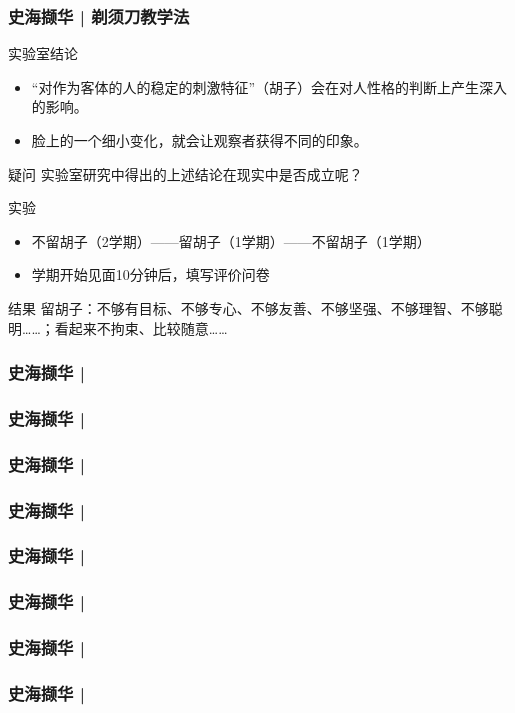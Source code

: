 \begin{frame}
  \frametitle{史海撷华 | 剃须刀教学法}
  \begin{block}{实验室结论}
    \begin{itemize}
      \item “对作为客体的人的稳定的刺激特征”（胡子）会在对人性格的判断上产生深入的影响。
      \item 脸上的一个细小变化，就会让观察者获得不同的印象。
    \end{itemize}
  \end{block}
  \vspace{-0.5em}
  \pause
  \begin{block}{疑问}
      实验室研究中得出的上述结论在现实中是否成立呢？
  \end{block}
  \vspace{-0.5em}
  \pause
  \begin{block}{实验}
    \begin{itemize}
      \item 不留胡子（2学期）——留胡子（1学期）——不留胡子（1学期）
      \item 学期开始见面10分钟后，填写评价问卷
    \end{itemize}
  \end{block}
  \vspace{-0.5em}
  \pause
  \begin{block}{结果}
留胡子：不够有目标、不够专心、不够友善、不够坚强、不够理智、不够聪明……；看起来不拘束、比较随意……
  \end{block}
\end{frame}

% 
\begin{frame}
  \frametitle{史海撷华 | }
\end{frame}

% 
\begin{frame}
  \frametitle{史海撷华 | }
\end{frame}

% 
\begin{frame}
  \frametitle{史海撷华 | }
\end{frame}

% 
\begin{frame}
  \frametitle{史海撷华 | }
\end{frame}

% 
\begin{frame}
  \frametitle{史海撷华 | }
\end{frame}

% 
\begin{frame}
  \frametitle{史海撷华 | }
\end{frame}

% 
\begin{frame}
  \frametitle{史海撷华 | }
\end{frame}

% 
\begin{frame}
  \frametitle{史海撷华 | }
\end{frame}



